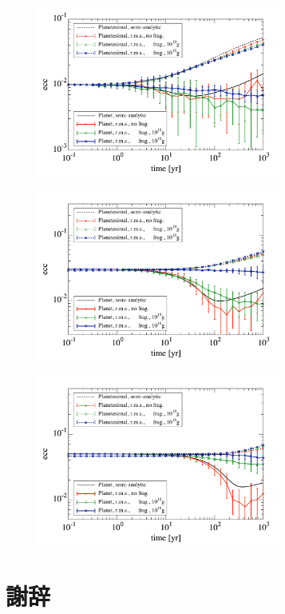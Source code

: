 \documentclass[a4paper,10pt,oneside,twocolumn,notitlepage,final]{jarticle}
\begin{document}
\begin{figure}[h]
 \centering
 \includegraphics[width=8cm]{./image/Ntr3E3_t1E3_dtlog_Mtot3E-5_ecc1E-2_noacc_ecc_wf_wof.pdf}
 \caption{\label{fig:ecc1_time}}
\end{figure}


\begin{figure}[h]
 \centering
 \includegraphics[width=8cm]{./image/Ntr3E3_t1E3_dtlog_Mtot3E-5_ecc3E-2_noacc_ecc_wf_wof.pdf}
 \caption{\label{fig:ecc3_time}}
\end{figure}


\begin{figure}[h]
 \centering
 \includegraphics[width=8cm]{./image/Ntr3E3_t1E3_dtlog_Mtot3E-5_ecc5E-2_noacc_ecc_wf_wof.pdf}
 \caption{\label{fig:ecc5_time}}
\end{figure}

\section*{謝辞}

\small


\end{document}
